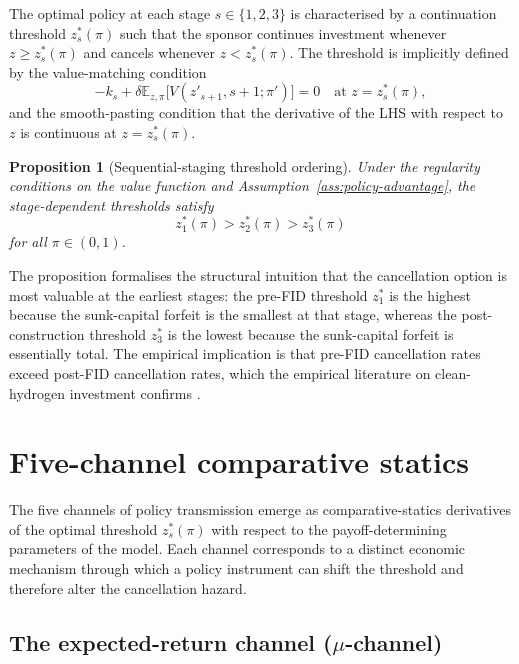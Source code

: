 \documentclass[12pt,a4paper]{article}
\newcommand{\E}{\mathbb{E}}
\theoremstyle{plain}
\newtheorem{proposition}{Proposition}
\theoremstyle{definition}
\begin{document}
The optimal policy at each stage $s \in \{1, 2, 3\}$ is characterised by a continuation threshold $z^{*}_{s}(\pi)$ such that the sponsor continues investment whenever $z \geq z^{*}_{s}(\pi)$ and cancels whenever $z < z^{*}_{s}(\pi)$. The threshold is implicitly defined by the value-matching condition
\begin{equation}
-k_s + \delta \E_{z, \pi}\!\big[V(z'_{s+1}, s+1; \pi')\big] = 0 \quad \text{at } z = z^{*}_{s}(\pi),
\label{eq:value-matching}
\end{equation}
and the smooth-pasting condition that the derivative of the LHS with respect to $z$ is continuous at $z = z^{*}_{s}(\pi)$.

\begin{proposition}[Sequential-staging threshold ordering]
\label{prop:threshold-ordering}
Under the regularity conditions on the value function and Assumption~\ref{ass:policy-advantage}, the stage-dependent thresholds satisfy
\[
z^{*}_{1}(\pi) > z^{*}_{2}(\pi) > z^{*}_{3}(\pi)
\]
for all $\pi \in (0, 1)$.
\end{proposition}
\noindent The proposition formalises the structural intuition that the cancellation option is most valuable at the earliest stages: the pre-FID threshold $z^{*}_{1}$ is the highest because the sunk-capital forfeit is the smallest at that stage, whereas the post-construction threshold $z^{*}_{3}$ is the lowest because the sunk-capital forfeit is essentially total. The empirical implication is that pre-FID cancellation rates exceed post-FID cancellation rates, which the empirical literature on clean-hydrogen investment confirms \citep{saakstra2026thesis}.

\section{Five-channel comparative statics}
\label{sec:five-channels}

The five channels of policy transmission emerge as comparative-statics derivatives of the optimal threshold $z^{*}_{s}(\pi)$ with respect to the payoff-determining parameters of the model. Each channel corresponds to a distinct economic mechanism through which a policy instrument can shift the threshold and therefore alter the cancellation hazard.

\subsection{The expected-return channel ($\mu$-channel)}
\label{sec:channel-mu}
\end{document}
